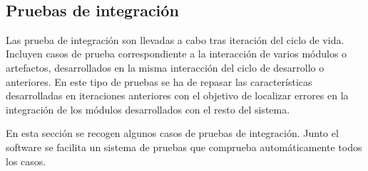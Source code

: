 \hfil \\
\subsection{Pruebas de integración}
Las prueba de integración son llevadas a cabo tras iteración del ciclo de vida. Incluyen casos de prueba correspondiente a la interacción de varios módulos o artefactos, desarrollados 
en la misma interacción del ciclo de desarrollo o anteriores. En este tipo de pruebas se ha de repasar las características desarrolladas en iteraciones anteriores con el objetivo de localizar errores en la integración 
de los módulos desarrollados con el resto del sistema.

En esta sección se recogen algunos casos de pruebas de integración. Junto el software se facilita un sistema de pruebas que comprueba automáticamente todos los casos.

